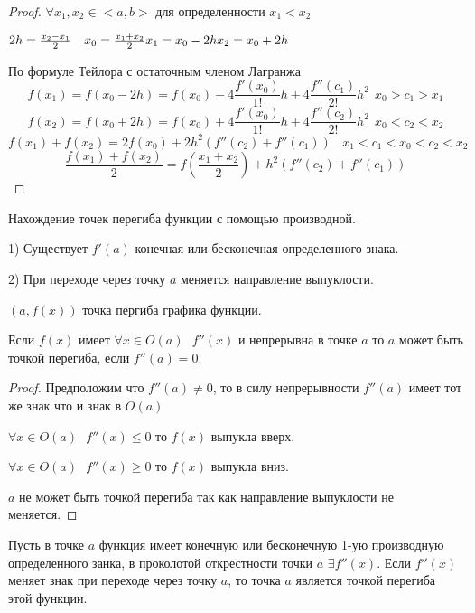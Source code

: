 \begin{proof}
  $\forall x_1,x_2 \in <a,b>$ для определенности $x_1 < x_2$

  $
  2h = \frac{x_2 - x_1}{2} ~~~
  x_0 = \frac{x_1 + x_2}{2}\\
  x_1 = x_0 - 2h\\
  x_2 = x_0 + 2h\\
  $

  По формуле Тейлора с остаточным членом Лагранжа
  $$
  f(x_1) = f(x_0 - 2h) = f(x_0) - 4\frac{f'(x_0)}{1!}h +
    4\frac{f''(c_1)}{2!}h^2 ~~ x_0 > c_1 > x_1
  $$
  $$
  f(x_2) = f(x_0 + 2h) = f(x_0) + 4\frac{f'(x_0)}{1!}h +
    4\frac{f''(c_2)}{2!}h^2 ~~ x_0 < c_2 < x_2
  $$
  $$
  f(x_1) + f(x_2) = 2f(x_0) + 2h^2(f''(c_2) + f''(c_1)) ~~~~
  x_1 < c_1 < x_0 < c_2 < x_2
  $$
  $$
  \frac{f(x_1) + f(x_2)}{2} = f(\frac{x_1 + x_2}{2}) + h^2(f''(c_2) + f''(c_1))
  $$
\end{proof}

\begin{title}[\Large]
  Нахождение точек перегиба функции с помощью производной.
\end{title}

\begin{defin}
  1) Существует $f'(a)$ конечная или бесконечная определенного знака.

  2) При переходе через точку $a$ меняется направление выпуклости.

  $(a, f(x))$ точка пергиба графика функции.
\end{defin}


\begin{block}
  Если $f(x)$ имеет $\forall x \in O(a) ~~~ f''(x)$ и непрерывна в
  точке $a$ то $a$ может быть точкой перегиба, если $f''(a) = 0$.
\end{block}

\begin{proof}
  Предположим что $f''(a)\not= 0$, то в силу непрерывности $f''(a)$ имеет
  тот же знак что и знак в $O(a)$

  $\forall x \in O(a) ~~~ f''(x) \le 0$ то $f(x)$ выпукла вверх.

  $\forall x \in O(a) ~~~ f''(x) \ge 0$ то $f(x)$ выпукла вниз.

  $a$ не может быть точкой перегиба так как направление выпуклости не меняется.
\end{proof}

\begin{block}
  Пусть в точке $a$ функция имеет конечную или бесконечную 1-ую производную
  определенного занка, в проколотой открестности точки $a$ $\exists f''(x)$.
  Если $f''(x)$ меняет знак при переходе через точку $a$, то точка $a$ является
  точкой перегиба этой функции.
\end{block}

